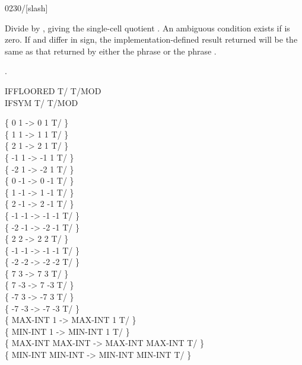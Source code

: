 \begin{worddef}{0230}{/}[slash]
\item {}

	Divide  by , giving the single-cell quotient
	. An ambiguous condition exists if  is zero.
	If  and  differ in sign, the
	implementation-defined result returned will be the same as that
	returned by either the phrase
	     
	or the phrase
	     .

\see {}.

	\begin{defer}
	\testing
		IFFLOORED \tab	\word{:} T/ T/MOD   \word{;} \\
		IFSYM \tab[2.6] \word{:} T/ T/MOD   \word{;}

		\{       0       1 \word{/} ->       0       1 T/ \} \\
		\{       1       1 \word{/} ->       1       1 T/ \} \\
		\{       2       1 \word{/} ->       2       1 T/ \} \\
		\{      -1       1 \word{/} ->      -1       1 T/ \} \\
		\{      -2       1 \word{/} ->      -2       1 T/ \} \\
		\{       0      -1 \word{/} ->       0      -1 T/ \} \\
		\{       1      -1 \word{/} ->       1      -1 T/ \} \\
		\{       2      -1 \word{/} ->       2      -1 T/ \} \\
		\{      -1      -1 \word{/} ->      -1      -1 T/ \} \\
		\{      -2      -1 \word{/} ->      -2      -1 T/ \} \\
		\{       2       2 \word{/} ->       2       2 T/ \} \\
		\{      -1      -1 \word{/} ->      -1      -1 T/ \} \\
		\{      -2      -2 \word{/} ->      -2      -2 T/ \} \\
		\{       7       3 \word{/} ->       7       3 T/ \} \\
		\{       7      -3 \word{/} ->       7      -3 T/ \} \\
		\{      -7       3 \word{/} ->      -7       3 T/ \} \\
		\{      -7      -3 \word{/} ->      -7      -3 T/ \} \\
		\{ MAX-INT       1 \word{/} -> MAX-INT       1 T/ \} \\
		\{ MIN-INT       1 \word{/} -> MIN-INT       1 T/ \} \\
		\{ MAX-INT MAX-INT \word{/} -> MAX-INT MAX-INT T/ \} \\
		\{ MIN-INT MIN-INT \word{/} -> MIN-INT MIN-INT T/ \}
	\end{defer}
\end{worddef}


